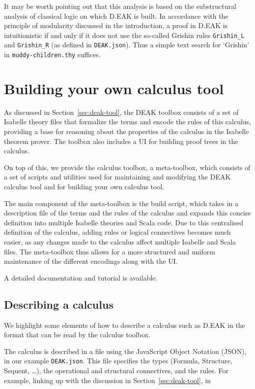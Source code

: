 \documentclass[runningheads,a4paper]{llncs}
\begin{document}
It may be worth pointing out that this analysis is based on the substructural analysis of classical logic on which D.EAK is built. In accordance with the principle of modularity discussed in the introduction, a proof in D.EAK is intuitionistic if and only 
if it does not use the so-called Grishin rules \texttt{Grishin\_L} and \texttt{Grishin\_R} (as defined in \texttt{DEAK.json}). Thus a simple text search for `Grishin' in \texttt{muddy-children.thy} suffices.



\section{Building your own calculus tool}\label{sec:meta-tool}
As discussed in Section~\ref{sec:deak-tool}, the DEAK toolbox consists of a set of Isabelle theory files that formalize the terms and encode the rules of this calculus, providing a base for reasoning about the properties of the calculus in the Isabelle theorem prover. The toolbox also includes a UI for building proof trees in the calculus.

On top of this, we provide the calculus toolbox, a meta-toolbox, which consists of a set of scripts and utilities used for maintaining and modifying the DEAK calculus tool and for building your own calculus tool.



The main component of the meta-toolbox is the build script, which takes in a description file of the terms and the rules of the calculus and expands this concise definition into multiple Isabelle theories and Scala code. Due to this centralised definition of the calculus, adding rules or logical connectives becomes much easier, as any changes made to the calculus affect multiple Isabelle and Scala files. The meta-toolbox thus allows for a more structured and uniform maintenance of the different encodings along with the UI.

A detailed documentation \cite{Balco:CT} and tutorial \cite{Balco:tutorial} is available.


\subsection{Describing a calculus}
We highlight some elements of how to describe a calculus such as D.EAK in the format that can be read by the calculus toolbox. 

The calculus is described in a file using the JavaScript Object Notation (JSON), in our example \texttt{DEAK.json}. This file specifies the types (Formula, Structure, Sequent, \dots), the operational and structural connectives, and the rules. For example, linking up with the discussion in Section~\ref{sec:deak-tool}, in
\end{document}
